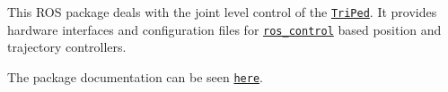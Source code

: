 This R\+OS package deals with the joint level control of the \href{https://github.com/TriPed-Robot/Wiki}{\tt Tri\+Ped}. It provides hardware interfaces and configuration files for \href{http://wiki.ros.org/ros_control}{\tt ros\+\_\+control} based position and trajectory controllers.

The package documentation can be seen \href{https://triped-robot.github.io/joint_level_control/}{\tt here}. 